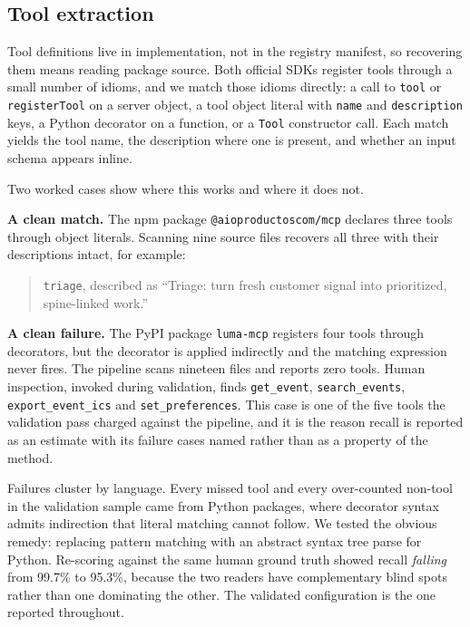 \documentclass[a4paper,fleqn]{cas-dc}
\begin{document}
\subsection{Tool extraction}\label{sec:extraction}

Tool definitions live in implementation, not in the registry manifest, so
recovering them means reading package source. Both official SDKs register tools
through a small number of idioms, and we match those idioms directly: a call to
\texttt{tool} or \texttt{registerTool} on a server object, a tool object literal
with \texttt{name} and \texttt{description} keys, a Python decorator on a
function, or a \texttt{Tool} constructor call. Each match yields the tool name,
the description where one is present, and whether an input schema appears
inline.

Two worked cases show where this works and where it does not.

\textbf{A clean match.} The npm package \texttt{@aioproductoscom/mcp} declares
three tools through object literals. Scanning nine source files recovers all
three with their descriptions intact, for example:

\begin{quote}
\small\texttt{triage}, described as ``Triage: turn fresh customer signal into
prioritized, spine-linked work.''
\end{quote}

\textbf{A clean failure.} The PyPI package \texttt{luma-mcp} registers four
tools through decorators, but the decorator is applied indirectly and the
matching expression never fires. The pipeline scans nineteen files and reports
zero tools. Human inspection, invoked during validation, finds
\texttt{get\_event}, \texttt{search\_events}, \texttt{export\_event\_ics} and
\texttt{set\_preferences}. This case is one of the five tools the validation
pass charged against the pipeline, and it is the reason recall is reported as
an estimate with its failure cases named rather than as a property of the
method.

Failures cluster by language. Every missed tool and every over-counted
non-tool in the validation sample came from Python packages, where decorator
syntax admits indirection that literal matching cannot follow. We tested the
obvious remedy: replacing pattern matching with an abstract syntax tree parse
for Python. Re-scoring against the same human ground truth showed recall
\emph{falling} from 99.7\% to 95.3\%, because the two readers have
complementary blind spots rather than one dominating the other. The validated
configuration is the one reported throughout.
\end{document}
